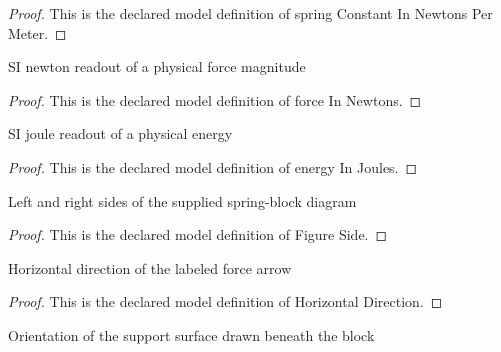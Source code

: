 \begin{proof}
  This is the declared model definition of spring Constant In Newtons Per Meter.
\end{proof}
\begin{definition}
  \label{def:physics:phyx-mini-0226:phyxminiproblems-problemphyxmini0226-forceinnewtons}
  SI newton readout of a physical force magnitude
\end{definition}
\begin{proof}
  This is the declared model definition of force In Newtons.
\end{proof}
\begin{definition}
  \label{def:physics:phyx-mini-0226:phyxminiproblems-problemphyxmini0226-energyinjoules}
  SI joule readout of a physical energy
\end{definition}
\begin{proof}
  This is the declared model definition of energy In Joules.
\end{proof}
\begin{definition}
  \label{def:physics:phyx-mini-0226:phyxminiproblems-problemphyxmini0226-figureside}
  Left and right sides of the supplied spring-block diagram
\end{definition}
\begin{proof}
  This is the declared model definition of Figure Side.
\end{proof}
\begin{definition}
  \label{def:physics:phyx-mini-0226:phyxminiproblems-problemphyxmini0226-horizontaldirection}
  Horizontal direction of the labeled force arrow
\end{definition}
\begin{proof}
  This is the declared model definition of Horizontal Direction.
\end{proof}
\begin{definition}
  \label{def:physics:phyx-mini-0226:phyxminiproblems-problemphyxmini0226-surfaceorientation}
  Orientation of the support surface drawn beneath the block
\end{definition}
